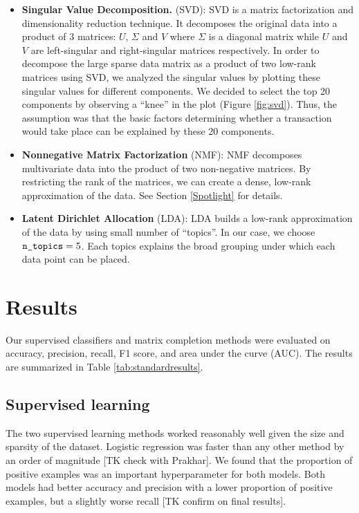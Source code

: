 \documentclass{article} %
\begin{document}
\begin{itemize}

    \item \textbf{Singular Value Decomposition.} (SVD): SVD is a matrix factorization and dimensionality reduction technique. It decomposes the original data into a product of 3 matrices: $U$, $\Sigma$ and $V$ where $\Sigma$ is a diagonal matrix while $U$ and $V$ are left-singular and right-singular matrices respectively. In order to decompose the large sparse data matrix as a product of two low-rank matrices using SVD, we analyzed the singular values by plotting these singular values for different components. We decided to select the top 20 components by observing a “knee” in the plot (Figure \ref{fig:svd}). Thus, the assumption was that the basic factors determining whether a transaction would take place can be explained by these 20 components.

    \item \textbf{Nonnegative Matrix Factorization} (NMF): NMF decomposes multivariate data into the product of two non-negative matrices. By restricting the rank of the matrices, we can create a dense, low-rank approximation of the data. See Section \ref{Spotlight} for details.

    \item \textbf{Latent Dirichlet Allocation} (LDA): LDA builds a low-rank approximation of the data by using small number of ``topics''. In our case, we choose $\texttt{\detokenize{n_topics}}=5$. Each topics explains the broad grouping under which each data point can  be placed.

\end{itemize}

\section{Results}

Our supervised classifiers and matrix completion methods were evaluated on accuracy, precision, recall, F1 score, and area under the curve (AUC). The results are summarized in Table \ref{tab:standardresults}.

\subsection{Supervised learning}

The two supervised learning methods worked reasonably well given the size and sparsity of the dataset. Logistic regression was faster than any other method by an order of magnitude [TK check with Prakhar]. We found that the proportion of positive examples was an important hyperparameter for both models. Both models had better accuracy and precision with a lower proportion of positive examples, but a slightly worse recall [TK confirm on final results].
\end{document}
